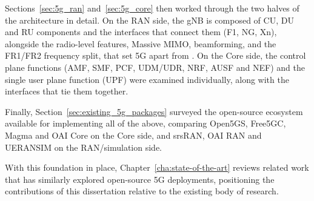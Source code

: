 Sections~\ref{sec:5g_ran} and~\ref{sec:5g_core} then worked through the two halves of the architecture in detail. On the \gls{RAN} side, the \gls{gNB} is composed of \gls{CU}, \gls{DU} and \gls{RU} components and the interfaces that connect them (\gls{F1}, \gls{NG}, \gls{Xn}), alongside the radio-level features, Massive \gls{MIMO}, beamforming, and the FR1/FR2 frequency split, that set 5G  apart from . On the Core side, the control plane functions (\gls{AMF}, \gls{SMF}, \gls{PCF}, \gls{UDM}/\gls{UDR}, \gls{NRF}, \gls{AUSF} and \gls{NEF}) and the single user plane function (\gls{UPF}) were examined individually, along with the interfaces that tie them together.

Finally, Section~\ref{sec:existing_5g_packages} surveyed the open-source ecosystem available for implementing all of the above, comparing Open5GS, Free5GC, Magma and \gls{OAI} Core on the Core side, and srsRAN, \gls{OAI} \gls{RAN} and UERANSIM on the \gls{RAN}/simulation side.

With this foundation in place, Chapter~\ref{cha:state-of-the-art} reviews related work that has similarly explored open-source 5G deployments, positioning the contributions of this dissertation relative to the existing body of research.